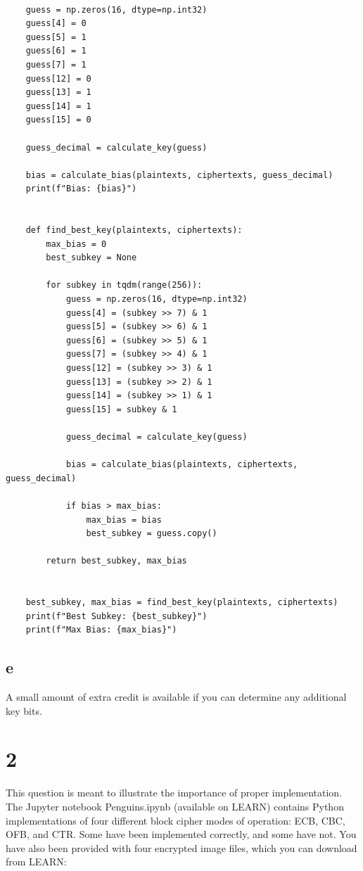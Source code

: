 \documentclass[11pt]{article}
\begin{document}
\begin{verbatim}
    
    guess = np.zeros(16, dtype=np.int32)
    guess[4] = 0
    guess[5] = 1
    guess[6] = 1
    guess[7] = 1
    guess[12] = 0
    guess[13] = 1
    guess[14] = 1
    guess[15] = 0
    
    guess_decimal = calculate_key(guess)
    
    bias = calculate_bias(plaintexts, ciphertexts, guess_decimal)
    print(f"Bias: {bias}")
    
    
    def find_best_key(plaintexts, ciphertexts):
        max_bias = 0
        best_subkey = None
    
        for subkey in tqdm(range(256)):
            guess = np.zeros(16, dtype=np.int32)
            guess[4] = (subkey >> 7) & 1
            guess[5] = (subkey >> 6) & 1
            guess[6] = (subkey >> 5) & 1
            guess[7] = (subkey >> 4) & 1
            guess[12] = (subkey >> 3) & 1
            guess[13] = (subkey >> 2) & 1
            guess[14] = (subkey >> 1) & 1
            guess[15] = subkey & 1
    
            guess_decimal = calculate_key(guess)
    
            bias = calculate_bias(plaintexts, ciphertexts, guess_decimal)
    
            if bias > max_bias:
                max_bias = bias
                best_subkey = guess.copy()
    
        return best_subkey, max_bias
    
    
    best_subkey, max_bias = find_best_key(plaintexts, ciphertexts)
    print(f"Best Subkey: {best_subkey}")
    print(f"Max Bias: {max_bias}")    
\end{verbatim}

\subsection{e} 

A small amount of extra credit is available if you can determine any additional
key bits.

\newpage

\section{2}

This question is meant to illustrate the importance of proper implementation. The Jupyter notebook Penguins.ipynb (available on LEARN) contains Python implementations of four diﬀerent block cipher modes of operation: ECB, CBC, OFB, and CTR. Some have been implemented correctly, and some have not. You have also been provided with four encrypted image ﬁles, which you can download from LEARN:
\end{document}
